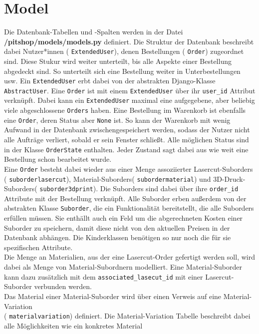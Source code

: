\documentclass[12pt]{article}
\newcommand{\dir}[1]{\textbf{/#1}}
\newcommand{\class}[1]{{\color{teal} \texttt{#1}}}
\newcommand{\attribute}[1]{{\color{orange} \texttt{#1}}}
\begin{document}
\section{Model}
Die Datenbank-Tabellen und -Spalten werden in der Datei \dir{pitshop/models/models.py} definiert. Die Struktur der Datenbank beschreibt dabei Nutzer*innen (\class{ExtendedUser}), denen 
Bestellungen (\class{Order}) zugeordnet sind. Diese Stukur wird weiter unterteilt, bis alle Aspekte einer Bestellung abgedeckt sind. So unterteilt sich eine Bestellung weiter in Unterbestellungen usw.
Ein \class{ExtendedUser} erbt dabei von der abstrakten Django-Klasse \class{AbstractUser}. Eine \class{Order} ist mit einem \class{ExtendedUser} über ihr \attribute{user_id} Attribut verknüpft.
Dabei kann ein \class{ExtendedUser} maximal eine aufgegebene, aber beliebig viele abgeschlossene \class{Orders} haben. Eine Bestellung im Warenkorb ist ebenfalls eine \class{Order}, deren Status aber \texttt{None} ist.
So kann der Warenkorb mit wenig Aufwand in der Datenbank zwischengespeichert werden, sodass der Nutzer nicht alle Aufträge verliert, sobald er sein Fenster schließt.
Alle möglichen Status sind in der Klasse \class{OrderState} enthalten. Jeder Zustand sagt dabei aus wie weit eine Bestellung schon bearbeitet wurde. \\ 
Eine \class{Order} besteht dabei wieder aus einer Menge assoziierter Lasercut-Suborders (\class{suborderlasercut}), Material-Suborders(\class{subordermaterial}) und 3D-Druck-Suborders(\class{suborder3dprint}).
Die Suborders sind dabei über ihre \attribute{order_id} Attribute mit der Bestellung verknüpft. Alle Suborder erben außerdem von der abstrakten Klasse \class{Suborder}, die ein Funktionalität bereitstellt, die alle Suborders erfüllen müssen.
Sie enthällt auch ein Feld um die abgerechneten Kosten einer Suborder zu speichern, damit diese nicht von den aktuellen Preisen in der Datenbank abhängen.
Die Kinderklassen benötigen so nur noch die für sie spezifischen Attribute. \\
Die Menge an Materialien, aus der eine Lasercut-Order gefertigt werden soll, wird dabei als Menge von Material-Subordnern modelliert. Eine Material-Suborder kann dazu zusätzlich mit dem \attribute{associated_lasecut_id} mit einer 
Lasercut-Suborder verbunden werden. \\
Das Material einer Material-Suborder wird über einen Verweis auf eine Material-Variation \\(\class{materialvariation}) definiert. Die Material-Variation Tabelle beschreibt dabei alle Möglichkeiten wie ein konkretes Material
\end{document}
